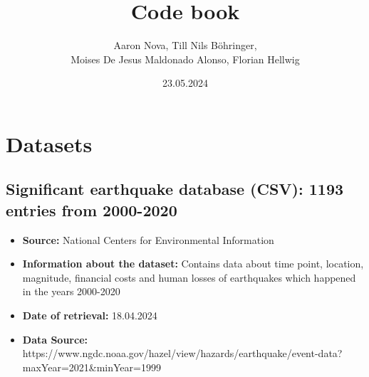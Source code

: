 \documentclass{article}
\title{Code book}
\author{Aaron Nova, Till Nils Böhringer, \\ 
Moises De Jesus Maldonado Alonso, Florian Hellwig}
\date{23.05.2024}
\begin{document}
\maketitle

\section{Datasets}

\subsection{Significant earthquake database (CSV): 1193 entries from 2000-2020}
\begin{itemize}
\item \textbf{Source:} National Centers for
Environmental Information
\item \textbf{Information about the dataset:} Contains data about time point, location, magnitude, financial costs and human losses of earthquakes which happened in the years 2000-2020
\item \textbf{Date of retrieval:} 18.04.2024
\item \textbf{Data Source:} https://www.ngdc.noaa.gov/hazel/view/hazards/earthquake/event-data?maxYear=2021\&minYear=1999
\end{itemize}

\begin{comment}

\subsection{WHICH ONE WILL WE USE? Population density of the world, years 2000, 2005, 2010, 2015, 2020 (GeoTIFF (.tif) and ASCII (.asc))}
\begin{itemize}
\item \textbf{Source:} [Insert Dataset Name]
\item \textbf{Information of the dataset:} [Insert information]
\item \textbf{Date of retrieval:} 
\item \textbf{Data Source:} https://sedac.ciesin.columbia.edu/data/set/gpw-v4-population-density-rev11/data-download
\end{itemize}

\subsection{WHICH ONE WILL WE USE? High-Resolution Population Density Maps around the year 2020 (GeoTIFF sometimes CSV)}
\begin{itemize}
\item \textbf{Source:} [Insert Dataset Name]
\item \textbf{Information of the dataset:} [Insert information]
\item \textbf{Date of retrieval:} [Insert Date]
\item \textbf{Data Source:} DOES NOT WORK: https://data.humdata.org/organization/meta?q=population%
\end{itemize}

\end{comment}
\end{document}
